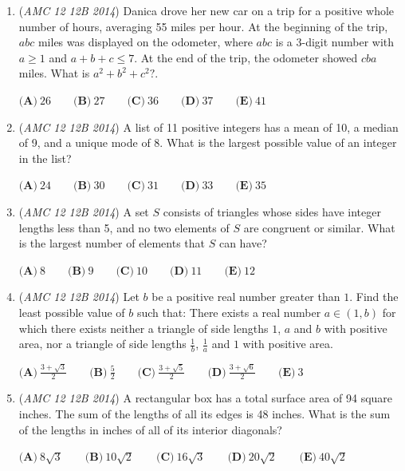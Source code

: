 \begin{enumerate}
$\textbf{(A)}\ 30\qquad\textbf{(B)}\ 36\qquad\textbf{(C)}\ 40\qquad\textbf{(D)}\ 48\qquad\textbf{(E)}\ 58.5$


	\item (\textit{AMC 12 12B 2014}) Danica drove her new car on a trip for a positive whole number of hours, averaging 55 miles per hour. At the beginning of the trip, $abc$ miles was displayed on the odometer, where $abc$ is a 3-digit number with $a \geq{1}$ and $a+b+c \leq{7}$. At the end of the trip, the odometer showed $cba$ miles. What is $a^2+b^2+c^2?$.


 $\textbf{(A)}\ 26\qquad\textbf{(B)}\ 27\qquad\textbf{(C)}\ 36\qquad\textbf{(D)}\ 37\qquad\textbf{(E)}\ 41$


	\item (\textit{AMC 12 12B 2014}) A list of 11 positive integers has a mean of 10, a median of 9, and a unique mode of 8. What is the largest possible value of an integer in the list?


 $\textbf{(A)}\ 24\qquad\textbf{(B)}\ 30\qquad\textbf{(C)}\ 31\qquad\textbf{(D)}\ 33\qquad\textbf{(E)}\ 35$


	\item (\textit{AMC 12 12B 2014}) A set $S$ consists of triangles whose sides have integer lengths less than 5, and no two elements of $S$ are congruent or similar. What is the largest number of elements that $S$ can have?


 $\textbf{(A)}\ 8\qquad\textbf{(B)}\ 9\qquad\textbf{(C)}\ 10\qquad\textbf{(D)}\ 11\qquad\textbf{(E)}\ 12$


	\item (\textit{AMC 12 12B 2014}) Let $b$ be a positive real number greater than $1$. Find the least possible value of $b$ such that: There exists a real number $a\in(1,b)$ for which there exists neither a triangle of side lengths $1$, $a$ and $b$ with positive area, nor a triangle of side lengths $\frac{1}{b}$, $\frac{1}{a}$ and $1$ with positive area.


 $\textbf{(A)}\ \frac{3+\sqrt{3}}{2}\qquad\textbf{(B)}\ \frac{5}{2}\qquad\textbf{(C)}\ \frac{3+\sqrt{5}}{2}\qquad\textbf{(D)}\ \frac{3+\sqrt{6}}{2}\qquad\textbf{(E)}\ 3$


	\item (\textit{AMC 12 12B 2014}) A rectangular box has a total surface area of 94 square inches. The sum of the lengths of all its edges is 48 inches. What is the sum of the lengths in inches of all of its interior diagonals?


 $\textbf{(A)}\ 8\sqrt{3}\qquad\textbf{(B)}\ 10\sqrt{2}\qquad\textbf{(C)}\ 16\sqrt{3}\qquad\textbf{(D)}\ 20\sqrt{2}\qquad\textbf{(E)}\ 40\sqrt{2}$



\end{enumerate}
